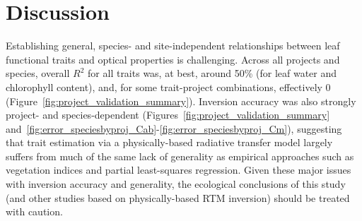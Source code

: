 \section{Discussion}

Establishing general, species- and site-independent relationships between leaf functional traits and optical properties is challenging.
Across all projects and species, overall $R^2$ for all traits was, at best, around 50\% (for leaf water and chlorophyll content), and, for some trait-project combinations, effectively 0 (Figure~\ref{fig:project_validation_summary}).
% 
% 
% 
% 
% 
Inversion accuracy was also strongly project- and species-dependent (Figures~\ref{fig:project_validation_summary} and~\ref{fig:error_speciesbyproj_Cab}-\ref{fig:error_speciesbyproj_Cm}), suggesting that trait estimation via a physically-based radiative transfer model largely suffers from much of the same lack of generality as empirical approaches such as vegetation indices and partial least-squares regression.
% 
% 
% 
Given these major issues with inversion accuracy and generality, the ecological conclusions of this study (and other studies based on physically-based RTM inversion) should be treated with caution.
% 
% 

